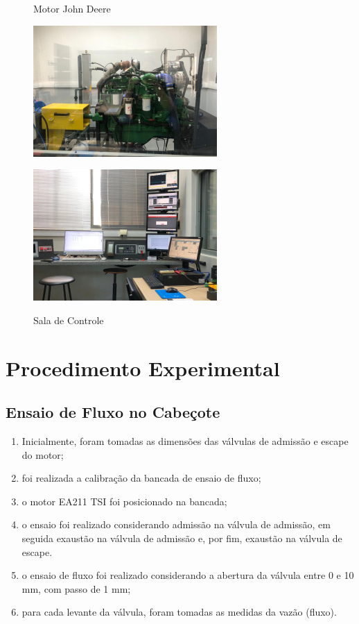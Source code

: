 %
\begin{figure}[!htb]
    \centering
    \begin{minipage}[t]{0.49\textwidth}
        \centering
        \caption{Motor John Deere}
        \includegraphics{figuras/motor_jd.png}
        \label{fig:motor_jd}
    \end{minipage}
    \hfill
    \begin{minipage}[t]{0.49\textwidth}
        \centering
        \caption{Sala de Controle}
        \includegraphics{figuras/sala_controle.png}
        \label{fig:sala_controle}
    \end{minipage}
\end{figure}
%
\section{Procedimento Experimental}

\subsection{Ensaio de Fluxo no Cabeçote}

\begin{enumerate}[label=\itshape\roman*.]
    \item Inicialmente, foram tomadas as dimensões das válvulas de admissão e escape do motor;
    \item foi realizada a calibração da bancada de ensaio de fluxo;
    \item o motor EA211 TSI foi posicionado na bancada;
    \item o ensaio foi realizado considerando admissão na válvula de admissão, em seguida exaustão na válvula de admissão e, por fim, exaustão na válvula de escape.
    \item o ensaio de fluxo foi realizado considerando a abertura da válvula entre 0 e 10 mm, com passo de 1 mm;
    \item para cada levante da válvula, foram tomadas as medidas da vazão (fluxo).
\end{enumerate}

